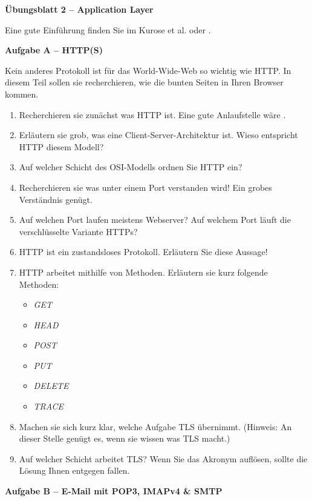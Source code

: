 \documentclass[paper=a4,fontsize=11pt]{scrartcl}%
\numberwithin{equation}{section}
\begin{document}
\begin{center}
\Large{\textbf{Übungsblatt 2 -- Application Layer}}
\end{center}
Eine gute Einführung finden Sie im Kurose et al. \cite[S. 83ff]{Kurose2012} oder \cite[S. 1317ff]{kozierok2005tcp}.

\begin{center}\Large{\textbf{Aufgabe A -- HTTP(S)}}\end{center}\vskip0.25in
Kein anderes Protokoll ist für das World-Wide-Web so wichtig wie HTTP. In diesem Teil sollen sie recherchieren, wie die bunten Seiten in Ihren Browser kommen.
\begin{enumerate}
	\item Recherchieren sie zunächst was HTTP ist. Eine gute Anlaufstelle wäre \cite[S. 98ff]{Kurose2012}.
	\item Erläutern sie grob, was eine Client-Server-Architektur ist. Wieso entspricht HTTP diesem Modell?
	\item Auf welcher Schicht des OSI-Modells ordnen Sie HTTP ein?
	\item Recherchieren sie was unter einem Port verstanden wird! Ein grobes Verständnis genügt.
	\item Auf welchen Port laufen meistens Webserver? Auf welchem Port läuft die verschlüsselte Variante HTTPs?
	\item HTTP ist ein zustandsloses Protokoll. Erläutern Sie diese Aussage!
	\item HTTP arbeitet mithilfe von Methoden. Erläutern sie kurz folgende Methoden:
	\begin{itemize}
		\item \emph{GET}
		\item \emph{HEAD}
		\item \emph{POST}
		\item \emph{PUT}
		\item \emph{DELETE}
		\item \emph{TRACE}
	\end{itemize}
	\item Machen sie sich kurz klar, welche Aufgabe TLS übernimmt. (Hinweis: An dieser Stelle genügt es, wenn sie wissen was TLS macht.)
	\item Auf welcher Schicht arbeitet TLS? Wenn Sie das Akronym auflösen, sollte die Lösung Ihnen entgegen fallen.
\end{enumerate}

\begin{center}\Large{\textbf{Aufgabe B -- E-Mail mit POP3, IMAPv4 \& SMTP}}\end{center}\vskip0.25in
\end{document}
